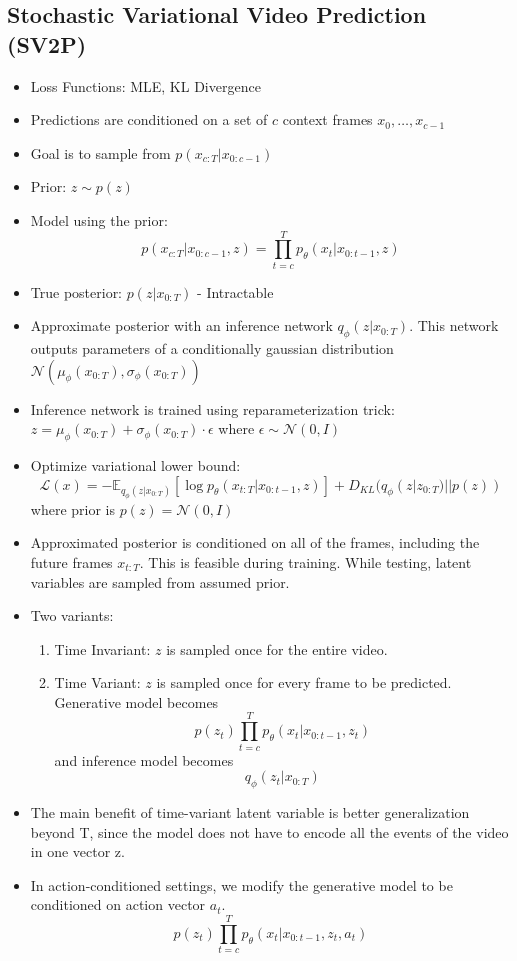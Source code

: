 \documentclass{article}
\begin{document}
    \subsection{Stochastic Variational Video Prediction (SV2P)}\label{subsec:Stochastic_Variational_Video_Prediction_(SV2P):sv2p}
    \begin{itemize}
        \item Loss Functions: MLE, KL Divergence
        \item Predictions are conditioned on a set of $c$ context frames $x_0,\dots,x_{c-1}$
        \item Goal is to sample from $p(x_{c:T} | x_{0:c-1})$
        \item Prior: $z \sim p(z)$
        \item Model using the prior: \[p(x_{c:T} | x_{0:c-1}, z) = \prod_{t=c}^T p_{\theta}(x_t|x_{0:t-1}, z)\]
        \item True posterior: $p(z|x_{0:T})$ - Intractable
        \item Approximate posterior with an inference network $q_\phi(z|x_{0:T})$.
        This network outputs parameters of a conditionally gaussian distribution $\mathcal{N}(\mu_\phi(x_{0:T}), \sigma_\phi(x_{0:T}))$
        \item Inference network is trained using reparameterization trick: $z = \mu_\phi(x_{0:T}) + \sigma_\phi(x_{0:T}) \cdot \epsilon$ where $\epsilon \sim \mathcal{N}(0,I)$
        \item Optimize variational lower bound:
        \[ \mathcal{L}(x) = -\mathbb{E}_{q_\phi(z|x_{0:T})} [ \log p_\theta(x_{t:T} | x_{0:t-1}, z)] + D_{KL} (q_\phi(z|z_{0:T}) || p(z)) \]
        where prior is $p(z) = \mathcal{N}(0,I)$
        \item Approximated posterior is conditioned on all of the frames, including the future frames $x_{t:T}$.
        This is feasible during training.
        While testing, latent variables are sampled from assumed prior.
        \item Two variants:
        \begin{enumerate}
            \item Time Invariant: $z$ is sampled once for the entire video.
            \item Time Variant: $z$ is sampled once for every frame to be predicted.
            Generative model becomes
            \[ p(z_t) \prod_{t=c}^{T} p_\theta(x_t | x_{0:t-1}, z_t) \]
            and inference model becomes
            \[ q_\phi(z_t | x_{0:T})\]
        \end{enumerate}
        \item The main benefit of time-variant latent variable is better generalization beyond T, since the model does not have to encode all the events of the video in one vector z.
        \item In action-conditioned settings, we modify the generative model to be conditioned on action vector $a_t$.
        \[ p(z_t) \prod_{t=c}^{T} p_\theta(x_t | x_{0:t-1}, z_t, a_t) \]
    \end{itemize}
\end{document}
